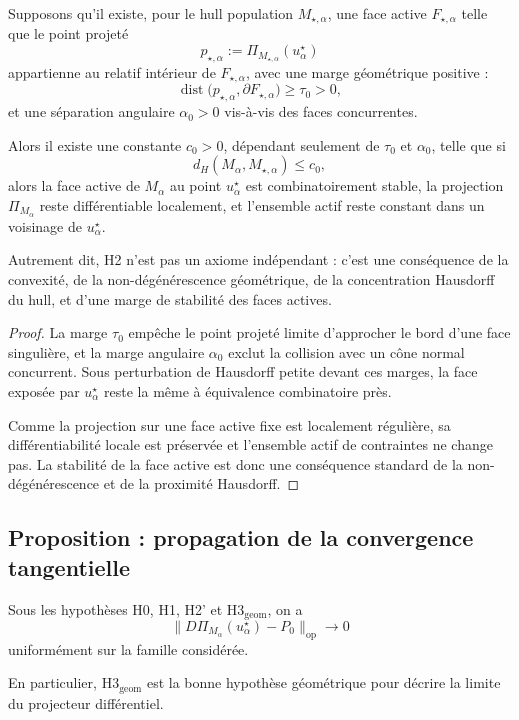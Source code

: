 \begin{proposition}
Supposons qu'il existe, pour le hull population \(M_{\star,\alpha}\), une face active \(F_{\star,\alpha}\) telle que le point projeté
\[
p_{\star,\alpha}:=\Pi_{M_{\star,\alpha}}(u_\alpha^\star)
\]
appartienne au relatif intérieur de \(F_{\star,\alpha}\), avec une marge géométrique positive :
\[
\operatorname{dist}\bigl(p_{\star,\alpha},\partial F_{\star,\alpha}\bigr)\ge \tau_0>0,
\]
et une séparation angulaire \(\alpha_0>0\) vis-à-vis des faces concurrentes.

Alors il existe une constante \(c_0>0\), dépendant seulement de \(\tau_0\) et \(\alpha_0\), telle que si
\[
d_H(M_\alpha,M_{\star,\alpha})\le c_0,
\]
alors la face active de \(M_\alpha\) au point \(u_\alpha^\star\) est combinatoirement stable, la projection \(\Pi_{M_\alpha}\) reste différentiable localement, et l'ensemble actif reste constant dans un voisinage de \(u_\alpha^\star\).

Autrement dit, H2 n'est pas un axiome indépendant : c'est une conséquence de la convexité, de la non-dégénérescence géométrique, de la concentration Hausdorff du hull, et d'une marge de stabilité des faces actives.
\end{proposition}

\begin{proof}
La marge \(\tau_0\) empêche le point projeté limite d'approcher le bord d'une face singulière, et la marge angulaire \(\alpha_0\) exclut la collision avec un cône normal concurrent.
Sous perturbation de Hausdorff petite devant ces marges, la face exposée par \(u_\alpha^\star\) reste la même à équivalence combinatoire près.

Comme la projection sur une face active fixe est localement régulière, sa différentiabilité locale est préservée et l'ensemble actif de contraintes ne change pas.
La stabilité de la face active est donc une conséquence standard de la non-dégénérescence et de la proximité Hausdorff.
\end{proof}

\subsection{Proposition : propagation de la convergence tangentielle}

\begin{proposition}
Sous les hypothèses H0, H1, H2' et H3\(_{\mathrm{geom}}\), on a
\[
\|D\Pi_{M_\alpha}(u_\alpha^\star)-P_0\|_{\mathrm{op}}\to 0
\]
uniformément sur la famille considérée.

En particulier, H3\(_{\mathrm{geom}}\) est la bonne hypothèse géométrique pour décrire la limite du projecteur différentiel.
\end{proposition}

